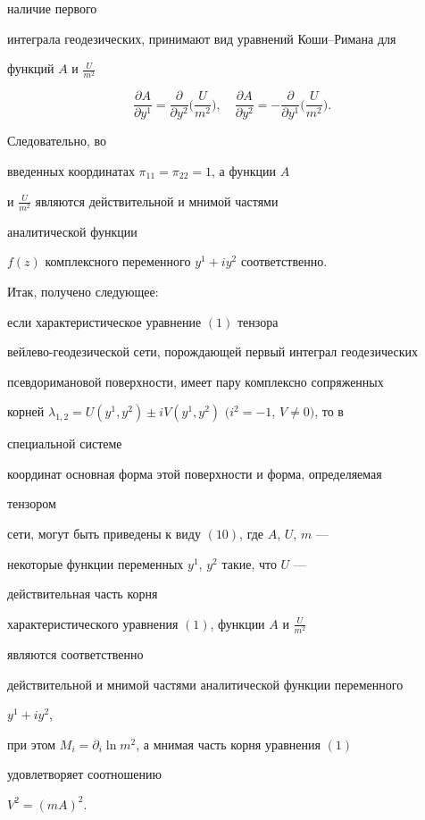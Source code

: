 наличие первого 


интеграла геодезических, принимают вид уравнений Коши--Римана для 


функций $A$ и $\frac{U}{m^2}$


$$ 


\frac{\partial A}{\partial y^1}= 


\frac{\partial}{\partial y^2}\bigg(\frac{U}{m^2}\bigg),\quad 


\frac{\partial A}{\partial y^2}=- 


\frac{\partial}{\partial y^1}\bigg(\frac{U}{m^2}\bigg). 


$$ 


Следовательно, во 


введенных координатах $\pi_{11}=\pi_{22}=1$, а функции $A$ 


и $\frac{U}{m^2}$ являются действительной и мнимой частями 


аналитической функции 


$f(z)$ комплексного переменного $y^1+i y^2$ соответственно. 


 


Итак, получено следующее: {\it  


если характеристическое уравнение $(1)$ тензора 


вейлево-гео\-де\-зи\-чес\-кой сети, порождающей первый интеграл геодезических 


псевдоримановой поверхности, имеет пару комплексно сопряженных 


корней $\lambda_{1,2}=U(y^1,y^2)\pm iV(y^1,y^2)$ $(i^2=-1$, $V\ne 0)$, то в 


специальной системе  


координат основная форма этой поверхности и форма, определяемая


тензором 


сети, могут быть приведены к виду $(10)$, где $A$, $U$, $m$ --- 


некоторые функции переменных $y^1$, $y^2$ такие, что $U$ ---


действительная часть корня 


характеристического уравнения $(1)$, функции $A$ и $\frac{U}{m^2}$ 


являются соответственно 


действительной и мнимой частями аналитической функции переменного 


$y^1+i y^2$, 


при этом $M_i=\partial_i\ln m^2$, а мнимая часть корня уравнения $(1)$ 


удовлетворяет соотношению


$V^2=(m A)^2$. 


} 


